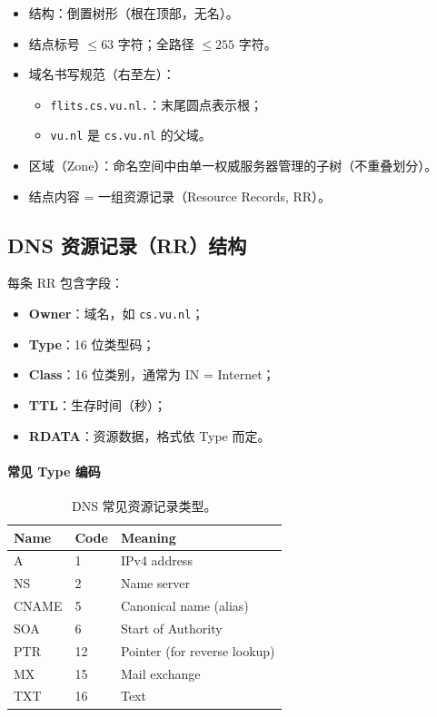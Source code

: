 \documentclass[UTF8,a4paper,11pt]{ctexart}
\begin{document}
\begin{itemize}
  \item 结构：倒置树形（根在顶部，无名）。
  \item 结点标号 \(\le 63\) 字符；全路径 \(\le 255\) 字符。
  \item 域名书写规范（右至左）：
  \begin{itemize}
    \item \texttt{flits.cs.vu.nl.}：末尾圆点表示根；
    \item \texttt{vu.nl} 是 \texttt{cs.vu.nl} 的父域。
  \end{itemize}
  \item 区域（Zone）：命名空间中由单一权威服务器管理的子树（不重叠划分）。
  \item 结点内容 = 一组资源记录（Resource Records, RR）。
\end{itemize}

\subsection{DNS 资源记录（RR）结构}

每条 RR 包含字段：
\begin{itemize}
  \item \textbf{Owner}：域名，如 \texttt{cs.vu.nl}；
  \item \textbf{Type}：16 位类型码；
  \item \textbf{Class}：16 位类别，通常为 IN = Internet；
  \item \textbf{TTL}：生存时间（秒）；
  \item \textbf{RDATA}：资源数据，格式依 Type 而定。
\end{itemize}

\paragraph{常见 Type 编码}
\begin{table}[H]
\centering
\begin{tabular}{@{}lll@{}}
\toprule
Name & Code & Meaning \\
\midrule
A & 1 & IPv4 address \\
NS & 2 & Name server \\
CNAME & 5 & Canonical name (alias) \\
SOA & 6 & Start of Authority \\
PTR & 12 & Pointer (for reverse lookup) \\
MX & 15 & Mail exchange \\
TXT & 16 & Text \\
\bottomrule
\end{tabular}
\caption{DNS 常见资源记录类型。}
\end{table}
\end{document}
